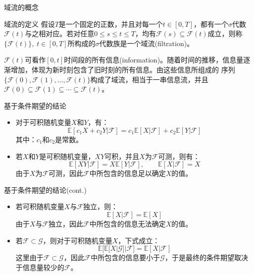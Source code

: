 \documentclass[t]{beamer}
\newcommand{\E}{\mathbb{E}}
\begin{document}
      
      \begin{frame}{域流的概念}
      \begin{block}{域流的定义}
      假设$T$是一个固定的正数，并且对每一个$t\in[0,T]$，都有一个$\sigma$代数$\mathcal{F}(t)$与之相对应。若对任意$0\le s\le t\le T$，均有$\mathcal{F}(s)\subseteq\mathcal{F}(t)$成立，则称$\{\mathcal{F}(t)\},\; t\in[0,T]$所构成的$\sigma$代数族是一个域流(filtration)。
      \end{block}
      
      $\mathcal{F}(t)$可看作$[0,t]$时间段的所有信息(information)。随着时间的推移，信息量逐渐增加，体现为新时刻包含了旧时刻的所有信息。由这些信息所组成的
      序列$\{\mathcal{F}(0), \mathcal{F}(1), \ldots, \mathcal{F}(t)\}$构成了域流，相当于一串信息流，并且$\mathcal{F}(0)\subseteq\mathcal{F}(1)\subseteq\cdots\subseteq \mathcal{F}(t)$。
      \end{frame}
      
      \begin{frame}{基于条件期望的结论}
      \begin{itemize}
      \item 对于可积随机变量$X$和$Y$，有：
      \begin{equation*}
      \E[c_1X+c_2Y|\mathcal{F}]=c_1\E[X|\mathcal{F}]+c_2\E[Y|\mathcal{F}]
      \end{equation*}
      其中：$c_1$和$c_2$是常数。
      
      \item 若$X$和$Y$是可积随机变量，$XY$可积，并且$X$为$\mathcal{F}$可测，则有：
      \begin{equation*}
      \E [XY|\mathcal{F}]=X\E[Y|\mathcal{F}],\qquad \E [X|\mathcal{F}]=X
      \end{equation*}
      由于$X$为$\mathcal{F}$可测，因此$\mathcal{F}$中所包含的信息足以确定$X$的值。
      
      
      \end{itemize}
      \end{frame}
      
      \begin{frame}{基于条件期望的结论(cont.)}
      \begin{itemize}
      \item  若可积随机变量$X$与$\mathcal{F}$独立，则：
      \begin{equation*}
      \E [X|\mathcal{F}]=\E [X]
      \end{equation*}
      由于$X$与$\mathcal{F}$独立，因此$\mathcal{F}$中所包含的信息无法确定$X$的值。
      
      \item  若$\mathcal{F}\subset \mathcal{G}$，则对于可积随机变量$X$，下式成立：
      \begin{equation*}
      \E\big[\E [X|\mathcal{G}]|\mathcal{F}\big]=\E [X|\mathcal{F}]
      \end{equation*}
      这里由于$\mathcal{F}\subset \mathcal{G}$，因此$\mathcal{F}$中所包含的信息要小于$\mathcal{G}$，于是最终的条件期望取决于信息量较少的$\mathcal{F}$。
      \end{itemize}
      \end{frame}
      
\end{document}
